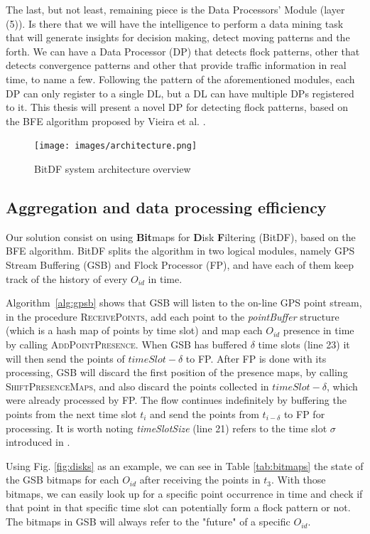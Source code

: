 The last, but not least, remaining piece is the Data Processors' Module (layer (5)). Is there that we will have the
intelligence to perform a data mining task that will generate insights for decision making, detect moving patterns and
the forth. We can have a Data Processor (DP) that detects flock patterns, other that detects convergence patterns and
other that provide traffic information in real time, to name a few. Following the pattern of the aforementioned modules,
each DP can only register to a single DL, but a DL can have multiple DPs registered to it. This thesis will present a
novel DP for detecting flock patterns, based on the BFE algorithm proposed by Vieira et al. \citep{vieira}.

\begin{figure}
    \centering
    \texttt{[image: images/architecture.png]}
    \caption{BitDF system architecture overview}
    \label{fig:architecture}
\end{figure}

\subsection{Aggregation and data processing efficiency}
Our solution consist on using \textbf{Bit}maps for \textbf{D}isk \textbf{F}iltering (BitDF), based on the BFE algorithm.
BitDF splits the algorithm in two logical modules, namely GPS Stream Buffering (GSB) and Flock Processor (FP), and have
each of them keep track of the history of every $O_{id}$ in time.

Algorithm~\ref{alg:gpsb} shows that GSB will listen to the on-line GPS point stream, in the procedure
\textsc{ReceivePoints}, add each point to the \textit{pointBuffer} structure (which is a hash map of points by time
slot) and map each $O_{id}$ presence in time by calling \textsc{AddPointPresence}. When GSB has buffered $\delta$ time
slots (line 23) it will then send the points of $timeSlot - \delta$ to FP. After FP is done with its processing, GSB
will discard the first position of the presence maps, by calling \textsc{ShiftPresenceMaps}, and also discard the points
collected in $timeSlot - \delta$, which were already processed by FP. The flow continues indefinitely by buffering the
points from the next time slot $t_i$ and send the points from $t_{i - \delta}$ to FP for processing. It is worth noting
\textit{timeSlotSize} (line 21) refers to the time slot $\sigma$ introduced in .

Using Fig. \ref{fig:disks} as an example, we can see in Table \ref{tab:bitmaps} the state of the GSB bitmaps for each
$O_{id}$ after receiving the points in $t_3$. With those bitmaps, we can easily look up for a specific point occurrence
in time and check if that point in that specific time slot can potentially form a flock pattern or not. The bitmaps in
GSB will always refer to the "future" of a specific $O_{id}$.

